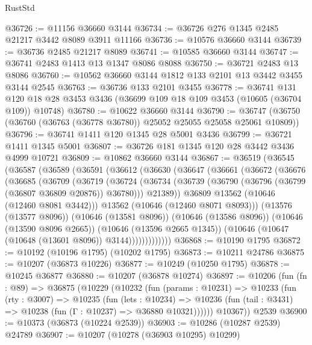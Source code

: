 \begin{lexlean}{RustStd}
\begin{coremodule}
@36726 := @11156 @36660 @3144
@36734 := @36726 @276 @1345 @2485 @21217 @3442 @8089 @3911 @11166
@36736 := @10576 @36660 @3144
@36739 := @36736 @2485 @21217 @8089
@36741 := @10585 @36660 @3144
@36747 := @36741 @2483 @1413 @13 @1347 @8086 @8088
@36750 := @36721 @2483 @13 @8086
@36760 := @10562 @36660 @3144 @1812 @133 @2101 @13 @3442 @3455 @3144 @2545
@36763 := @36736 @133 @2101 @3455
@36778 := @36741
    @131
    @120
    @18
    @28
    @3453
    @3436
    (@36699 @109 @18 @109 @3453 (@10605 (@36704 @109)) @10748)
@36780 := @10622 @36660 @3144
@36790 := @36747 (@36750 (@36760 (@36763 (@36778 @36780)) @25052 @25055 @25058 @25061 @10809))
@36796 := @36741 @1411 @120 @1345 @28 @5001 @3436
@36799 := @36721 @1411 @1345 @5001
@36807 := @36726 @181 @1345 @120 @28 @3442 @3436 @4999 @10721
@36809 := @10862 @36660 @3144
@36867 := @36519
    (@36545
      (@36587
        (@36589
          (@36591
            (@36612
              (@36630
                (@36647
                  (@36661
                    (@36672
                      (@36676
                        (@36685
                          (@36709
                            (@36719
                              (@36724
                                (@36734
                                  (@36739 (@36790 (@36796 (@36799 (@36807 @36809 @20876)) @36780)))
                                  @21389))
                              @36809
                              @13562
                              (@10646 (@12460 @8081 @3442)))
                            @13562
                            (@10646 (@12460 @8071 @8093)))
                          (@13576 (@13577 @8096))
                          (@10646 (@13581 @8096))
                          (@10646 (@13586 @8096))
                          (@10646 (@13590 @8096 @2665))
                          (@10646 (@13596 @2665 @1345))
                          (@10646 (@10647 (@10648 (@13601 @8096)) @3144)))))))))))))
@36868 := @10190 @1795
@36872 := @10192 (@10196 @1795) (@10202 @1795)
@36873 := @10211 @24786
@36875 := @10207 (@36873 @10226)
@36877 := @10249 (@10250 @1795)
@36878 := @10245 @36877
@36880 := @10207 (@36878 @10274)
@36897 := @10206
    (fun (fn : @89) =>
    @36875
      (@10229
        (@10232
          (fun (params : @10231) =>
          @10233
            (fun (rty : @3007) =>
            @10235
              (fun (lets : @10234) =>
              @10236 (fun (tail : @3431) => @10238 (fun (Γ : @10237) => @36880 @10321))))))
        @10367))
    @2539
@36900 := @10373 (@36873 (@10224 @2539))
@36903 := @10286 (@10287 @2539) @24789
@36907 := @10207 (@10278 (@36903 @10295) @10299)

\end{coremodule}
\end{lexlean}
